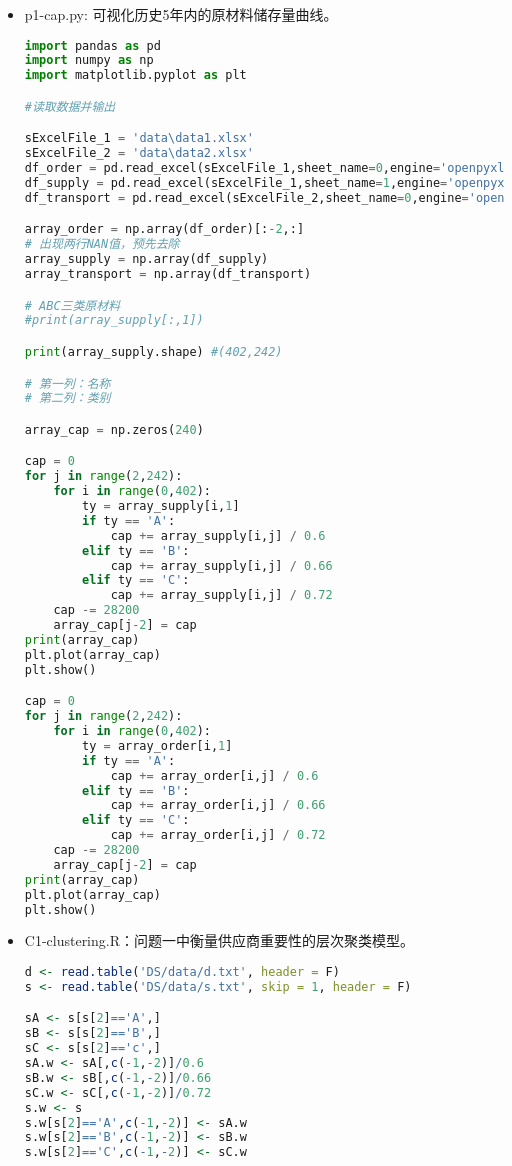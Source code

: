 \documentclass{my_paper}
\begin{document}
\begin{itemize} 

\item p1-cap.py: 可视化历史5年内的原材料储存量曲线。

\begin{lstlisting}[language={Python}]
import pandas as pd 
import numpy as np
import matplotlib.pyplot as plt 

#读取数据并输出

sExcelFile_1 = 'data\data1.xlsx'
sExcelFile_2 = 'data\data2.xlsx'
df_order = pd.read_excel(sExcelFile_1,sheet_name=0,engine='openpyxl')
df_supply = pd.read_excel(sExcelFile_1,sheet_name=1,engine='openpyxl')
df_transport = pd.read_excel(sExcelFile_2,sheet_name=0,engine='openpyxl')

array_order = np.array(df_order)[:-2,:]
# 出现两行NAN值，预先去除
array_supply = np.array(df_supply)
array_transport = np.array(df_transport)

# ABC三类原材料
#print(array_supply[:,1])

print(array_supply.shape) #(402,242)

# 第一列：名称
# 第二列：类别

array_cap = np.zeros(240)

cap = 0
for j in range(2,242):
    for i in range(0,402):
        ty = array_supply[i,1]
        if ty == 'A':
            cap += array_supply[i,j] / 0.6
        elif ty == 'B':
            cap += array_supply[i,j] / 0.66
        elif ty == 'C':
            cap += array_supply[i,j] / 0.72
    cap -= 28200
    array_cap[j-2] = cap
print(array_cap)
plt.plot(array_cap)
plt.show()

cap = 0
for j in range(2,242):
    for i in range(0,402):
        ty = array_order[i,1]
        if ty == 'A':
            cap += array_order[i,j] / 0.6
        elif ty == 'B':
            cap += array_order[i,j] / 0.66
        elif ty == 'C':
            cap += array_order[i,j] / 0.72
    cap -= 28200
    array_cap[j-2] = cap
print(array_cap)
plt.plot(array_cap)
plt.show()
\end{lstlisting}
\item C1-clustering.R：问题一中衡量供应商重要性的层次聚类模型。

\begin{lstlisting}[language=R]
d <- read.table('DS/data/d.txt', header = F)
s <- read.table('DS/data/s.txt', skip = 1, header = F)

sA <- s[s[2]=='A',]
sB <- s[s[2]=='B',]
sC <- s[s[2]=='c',]
sA.w <- sA[,c(-1,-2)]/0.6
sB.w <- sB[,c(-1,-2)]/0.66
sC.w <- sC[,c(-1,-2)]/0.72
s.w <- s
s.w[s[2]=='A',c(-1,-2)] <- sA.w
s.w[s[2]=='B',c(-1,-2)] <- sB.w
s.w[s[2]=='C',c(-1,-2)] <- sC.w


\end{lstlisting}
\end{itemize}
\end{document}
